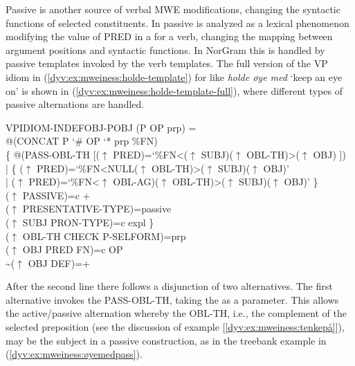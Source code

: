 \documentclass[output=paper]{langsci/langscibook}
\begin{document}
Passive is another source of verbal MWE modifications, changing the syntactic functions of selected constituents.
In  passive is analyzed as a lexical phenomenon modifying the value of PRED in a  for a verb, changing the mapping between argument positions and syntactic functions.
In NorGram this is handled by passive templates invoked by the verb templates.
The full version of the VP idiom  in (\ref{dyv:ex:mweiness:holde-template}) for  like \textit{holde øye med} `keep an eye on' is shown in (\ref{dyv:ex:mweiness:holde-template-full}), where different types of passive alternations are handled.


\ea\label{dyv:ex:mweiness:holde-template-full}
{\small 
 VPIDIOM-INDEFOBJ-POBJ (P OP prp) =\\%
\hspace{1.5em} @(CONCAT P `\# OP `* prp \%FN)\\%
\hspace{1.5em}  \{ \enspace @(PASS-OBL-TH [($\uparrow$  PRED)=`\%FN<($\uparrow$ SUBJ)($\uparrow$ OBL-TH)>($\uparrow$ OBJ) ])\\%
\hspace{1.5em} | \enspace \{ \enspace ($\uparrow$  PRED)=`\%FN<NULL($\uparrow$ OBL-TH)>($\uparrow$ SUBJ)($\uparrow$ OBJ)'\\%
\hspace{1.5em} \quad | \enspace ($\uparrow$  PRED)=`\%FN<$\uparrow$ OBL-AG)($\uparrow$  OBL-TH)>($\uparrow$ SUBJ)($\uparrow$ OBJ)' \enspace \}\\%
\hspace{1.5em} \quad ($\uparrow$ PASSIVE)=c +\\%
\hspace{1.5em} \quad ($\uparrow$ PRESENTATIVE-TYPE)=passive\\%
\hspace{1.5em} \quad ($\uparrow$ SUBJ PRON-TYPE)=c expl \enspace \}\\%
\hspace{1.5em} ($\uparrow$ OBL-TH CHECK P-SELFORM)=prp\\%
\hspace{1.5em} ($\uparrow$ OBJ PRED FN)=c OP\\%
\hspace{1.5em} {\textasciitilde}($\uparrow$ OBJ DEF)=+
}
\z

After the second line there follows a disjunction of two alternatives.
The first alternative invokes the  PASS-OBL-TH, taking the  as a parameter.
This  allows the active/passive alternation whereby the OBL-TH, i.e., the complement of the selected preposition (see the discussion of example [\ref{dyv:ex:mweiness:tenkepå}]), may be the subject in a passive construction, as in the treebank example in (\ref{dyv:ex:mweiness:øyemedpass}).
\end{document}
